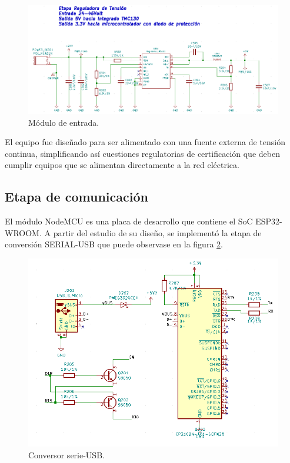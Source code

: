 \begin{figure}[!h]
	\centering
	\includegraphics[width=1\textwidth]{./Figures/kicad_tension_v1.png}
	\caption{Módulo de entrada.}
	\label{fig:kicad_tension}
\end{figure}
  
El equipo fue diseñado para ser alimentado con una fuente externa de tensión continua, simplificando así cuestiones regulatorias de certificación que deben cumplir equipos que se alimentan directamente a la red eléctrica.

\subsection{Etapa de comunicación}

El módulo NodeMCU es una placa de desarrollo que contiene el SoC ESP32-WROOM. A partir del estudio de su diseño, se implementó la etapa de conversión SERIAL-USB que puede observase en la figura \ref{fig:kicad_conversor}. 


\begin{figure}[!h]
	\centering
	\includegraphics[width=1\textwidth]{./Figures/kicad_conversor.png}
	\caption{Conversor serie-USB.}
	\label{fig:kicad_conversor}
\end{figure}

